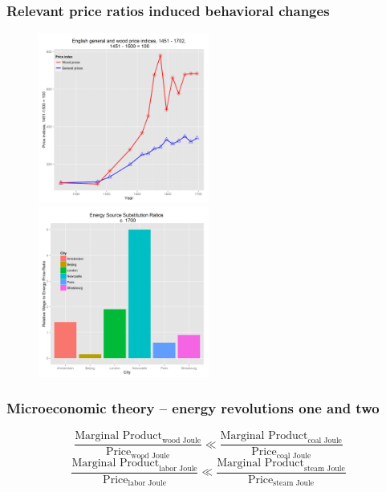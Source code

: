 \documentclass[final]{beamer}
\begin{document}
\begin{frame}
\frametitle{Relevant price ratios induced behavioral changes} %
\begin{figure}[p!]
\label{fig:wage-energy}
		\centerline{
		\mbox{\includegraphics[width=0.5\textwidth]{woodPrice}}
		\mbox{\includegraphics[width=0.5\textwidth]{wage-energy}}
		}
\end{figure}
\end{frame}

\begin{frame}
\frametitle{Microeconomic theory -- energy revolutions one and two}
\small{
		\begin{equation}
		\label{eq:mrp}
		\frac{\text{Marginal Product}_{\text{wood Joule}}}{\text{Price}_{\text{wood Joule}}} \ll \frac{\text{Marginal Product}_{\text{coal Joule}}}{\text{Price}_{\text{coal Joule}}}
		\end{equation}
		\pause
		\begin{equation}
		\label{eq:mrp2}
		\frac{\text{Marginal Product}_{\text{labor Joule}}}{\text{Price}_{\text{labor Joule}}} \ll \frac{\text{Marginal Product}_{\text{steam Joule}}}{\text{Price}_{\text{steam Joule}}}
		\end{equation}
}
\end{frame}
\end{document}
